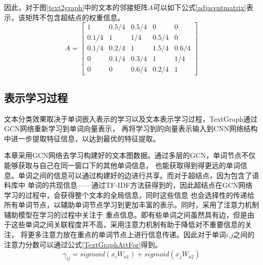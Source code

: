 因此，对于图\ref{text2graph}中的文本的邻接矩阵$A$可以如下公式\ref{adjacentmatrix}表示，该矩阵不包含超结点的权重信息。
\begin{equation}
    \label{adjacentmatrix}
    A=\left[
    {\begin{array}{*{20}{c}}
     {\text{1}}&{{\text{0}}{\text{.5/4}}}&{{\text{0}}{\text{.5/4}}}&{\text{0}}&{\text{0}} \\
     {{\text{0}}{\text{.1/4}}}&{\text{1}}&{\text{1/4}}&{{\text{0}}{\text{.5/4}}}&{\text{0}} \\
     {{\text{0}}{\text{.1/4}}}&{{\text{0}}{\text{.2/4}}}&{\text{1}}&{{\text{1}}{\text{.5/4}}}&{{\text{0}}{\text{.6/4}}} \\
     {\text{0}}&{{\text{0}}{\text{.1/4}}}&{{\text{0}}{\text{.3/4}}}&{\text{1}}&{\text{1/4}} \\
     {\text{0}}&{\text{0}}&{{\text{0}}{\text{.6/4}}}&{{\text{0}}{\text{.2/4}}}&{\text{1}}
    \end{array}}
    \right]
    \end{equation}

\subsection{表示学习过程}
文本分类效果取决于单词嵌入表示的学习以及文本表示学习过程，TextGraph通过GCN网络重新学习到单词向量表示，
再将学习到的向量表示输入到CNN网络结构中进一步提取特征信息，以达到最优的特征提取。

本章采用GCN网络去学习构建好的文本图数据。通过多层的GCN，单词节点不仅能够获取与自己在同一窗口下的其他单词信息，
也能获取得到得更远的单词信息。单词之间的信息可以通过构建好的边进行共享。而对于超结点，因为包含了语料库中
单词的共现信息——通过TF-IDF方法获得到的，因此超结点在GCN网络学习的过程中，会获得整个文本的全局信息，同时这些信息
也会选择性的传递给所有单词节点，以辅助单词节点学习到更加丰富的表示。同时，采用了注意力机制辅助模型在学习的过程中关注于
重点信息。即有些单词之间虽然具有边，但是由于这些单词之间关联程度并不高，采用注意力机制有助于降低对不重要信息的关注，
将更多注意力放在重点的单词节点上进行信息传递。因此对于单词$i$,$j$之间的注意力分数可以通过公式\ref{TextGraphAttFor}得到。
\begin{equation}\label{TextGraphAttFor}
    \gamma_{ij}=sigmoid(x_iW_{a1})+sigmoid(x_jW_{a2})
\end{equation}

